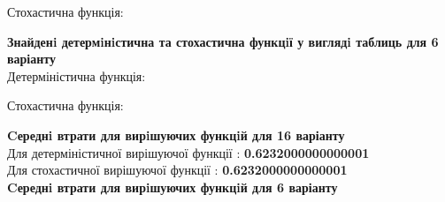 Стохастична функція:\\
\begin{figure}[h!]
\label{fig:image}
\end{figure}    

\newpage
\textbf{Знайденi детермiнiстична та стохастична функцiї у виглядi таблиць для 6 варіанту}
\\

Детерміністична функція:\\
\begin{figure}[h!]
\label{fig:image}
\end{figure}      

Стохастична функція:\\
\begin{figure}[h!]
\label{fig:image}
\end{figure}      


\newpage
\textbf{Cереднi втрати для вирiшуючих функцiй для 16 варіанту}
\\

Для детерміністичної вирішуючої функції : \textbf{0.6232000000000001}
\\

Для стохастичної вирішуючої функції : \textbf{0.6232000000000001} 
\\
    
\textbf{Cереднi втрати для вирiшуючих функцiй для 6 варіанту}
\\
   
